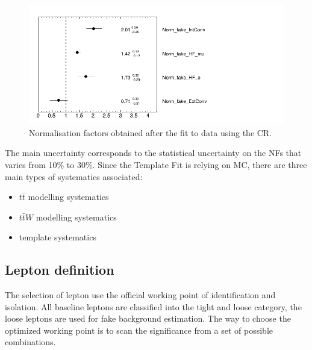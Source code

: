 \begin{figure}[!h]
\begin{center}
\includegraphics[width=.7\textwidth]{figures/2LSS/NormFactors.png}
\end{center}
\caption{
Normalisation factors obtained after the fit to data using the CR.
\label{fig:TFNF} }
\end{figure}

The main uncertainty corresponds to the statistical uncertainty on the NFs that
varies from 10\% to 30\%. Since the Template Fit is relying on MC, there are
three main types of systematics associated: 

\begin{itemize}
\item $t\bar{t}$ modelling systematics
\item $t\bar{t}W$ modelling systematics
\item template systematics
\end{itemize}





\subsection{Lepton definition}
The selection of lepton use the official working point of identification and isolation. All baseline leptons are classified into the tight and loose category, the loose leptons are used for fake background estimation. The way to choose the optimized working point is to scan the significance from a set of possible combinations.\\

